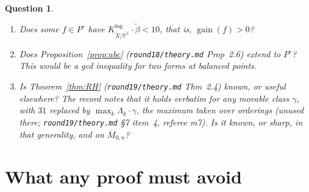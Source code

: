 \documentclass[11pt]{article}
\newtheorem{question}{Question}
\newcommand{\PP}{\mathbb P}
\newcommand{\gain}{\operatorname{gain}}
\newcommand{\rec}[1]{\texttt{#1}}
\begin{document}
\begin{question}\label{q:C}\leavevmode
\begin{enumerate}[label=(\alph*)]
  \item Does some \(f\in P^\circ\) have
    \(K^{\log}_{\tilde X/\PP^1}\cdot\tilde\beta<10\), that is,
    \(\gain(f)>0\)?
  \item Does Proposition~\ref{prop:abc} (\rec{round18/theory.md} Prop~2.6)
    extend to \(P^\circ\)?  This would be a gcd inequality for two forms at
    balanced points.
  \item Is Theorem~\ref{thm:RH} (\rec{round19/theory.md} Thm~2.4) known, or
    useful elsewhere?  The record notes that it holds verbatim for any movable
    class \(\gamma\), with \(31\) replaced by \(\max_k\Lambda_k\cdot\gamma\),
    the maximum taken over orderings (unused there; \rec{round19/theory.md}
    \S7 item~4, referee m7).  Is it known, or sharp, in that generality, and
    on \(\overline M_{0,n}\)?
\end{enumerate}
\end{question}

\section{What any proof must avoid}\label{sec:avoid}
\end{document}
